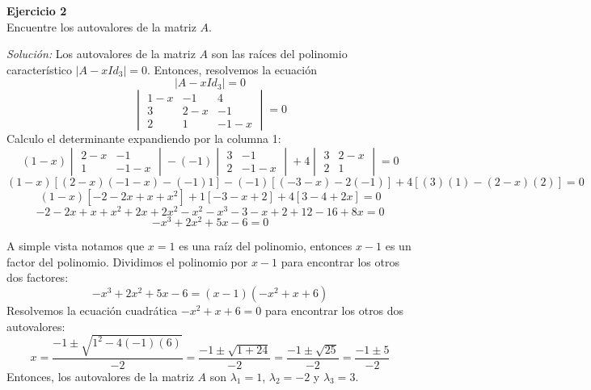 \documentclass{article}
\newenvironment{problem}[2][Ejercicio]
    { \begin{mdframed}[backgroundcolor=gray!20] \textbf{#1 #2} \\}
    {  \end{mdframed}}
\newenvironment{solution}
    {\textit{Solución:}}
    {}
\begin{document}
\begin{problem}{2}
    Encuentre los autovalores de la matriz $A$.
\end{problem}
\begin{solution}
    Los autovalores de la matriz $A$ son las raíces del polinomio característico $|A - xId_3| = 0$. Entonces, resolvemos la ecuación
    $$
    |A - xId_3| = 0
    $$
    $$
    \begin{vmatrix}
    1-x & -1 & 4 \\
    3 & 2-x & -1 \\
    2 & 1 & -1-x
    \end{vmatrix} = 0
    $$
    Calculo el determinante expandiendo por la columna 1:
    $$
    (1-x)\begin{vmatrix}
    2-x & -1 \\
    1 & -1-x
    \end{vmatrix} - (-1)\begin{vmatrix}
    3 & -1 \\
    2 & -1-x
    \end{vmatrix} + 4\begin{vmatrix}
    3 & 2-x \\
    2 & 1
    \end{vmatrix} = 0
    $$
    $$
    (1-x)[(2-x)(-1-x) - (-1)1] - (-1)[(-3-x) - 2(-1)] + 4[(3)(1) - (2-x)(2)] = 0
    $$
    $$
    (1-x)[-2-2x+x+x^2] + 1[-3-x+2] + 4[3-4+2x] = 0
    $$
    $$
    -2-2x+x+x^2+2x+2x^2-x^2-x^3-3-x+2+12-16+8x = 0
    $$
    $$
    -x^3+2x^2+5x-6 = 0
    $$

A simple vista notamos que $x=1$ es una raíz del polinomio, entonces $x-1$ es un factor del polinomio. Dividimos el polinomio por $x-1$ para encontrar los otros dos factores: 
$$
-x^3+2x^2+5x-6 = (x-1)(-x^2+x+6)
$$
Resolvemos la ecuación cuadrática $-x^2+x+6 = 0$ para encontrar los otros dos autovalores: 
$$
x = \frac{-1 \pm \sqrt{1^2-4(-1)(6)}}{-2} = \frac{-1 \pm \sqrt{1+24}}{-2} = \frac{-1 \pm \sqrt{25}}{-2} = \frac{-1 \pm 5}{-2}
$$
Entonces, los autovalores de la matriz $A$ son $\lambda_1 = 1$, $\lambda_2 = -2$ y $\lambda_3 = 3$.
\end{solution}
\end{document}
